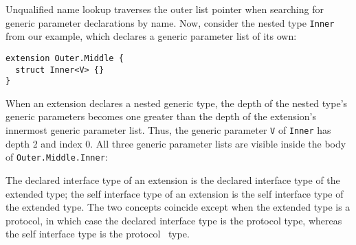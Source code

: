 \documentclass[../generics]{subfiles}
\begin{document}
Unqualified name lookup traverses the outer list pointer when searching for generic parameter declarations by name. Now, consider the nested type \texttt{Inner} from our example, which declares a generic parameter list of its own:
\begin{Verbatim}
extension Outer.Middle {
  struct Inner<V> {}
}
\end{Verbatim}
When an extension declares a nested generic type, the depth of the nested type's generic parameters becomes one greater than the depth of the extension's innermost generic parameter list. Thus, the generic parameter \texttt{V} of \texttt{Inner} has depth 2 and index 0. All three generic parameter lists are visible inside the body of \texttt{Outer.Middle.Inner}:
\begin{quote}
\end{quote}
The declared interface type of an extension is the declared interface type of the extended type; the self interface type of an extension is the self interface type of the extended type. The two concepts coincide except when the extended type is a protocol, in which case the declared interface type is the protocol type, whereas the self interface type is the \IndexSelf protocol \tSelf\ type.
\end{document}
